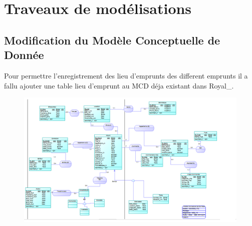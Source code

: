 \section{Traveaux de modélisations} 
\subsection{Modification du Modèle Conceptuelle de Donnée}

Pour permettre l'enregistrement des lieu d'emprunts des different emprunts il a fallu ajouter une table lieu d'emprunt au MCD déja existant dans Royal\_.
\begin{figure}
\includegraphics[width=12cm]{MCD_Royal_Modif.png}
\end{figure}